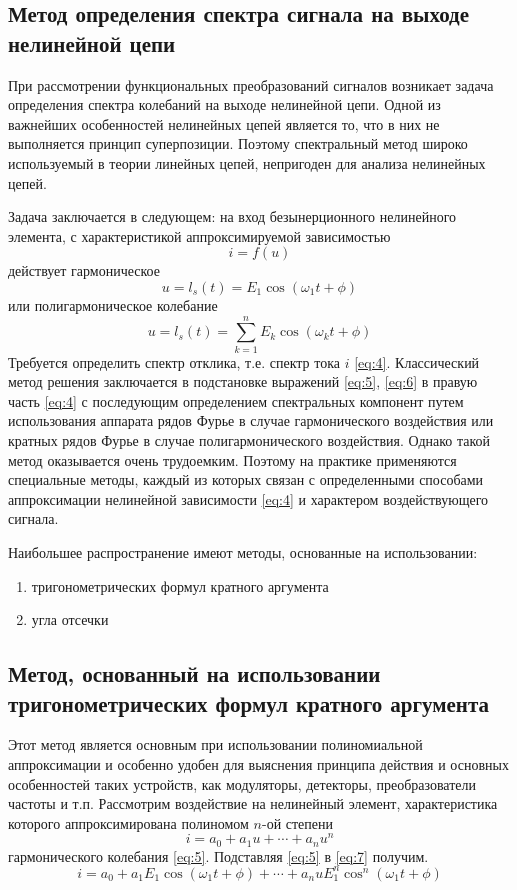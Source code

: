 \subsection{Метод определения спектра сигнала на выходе нелинейной цепи}
При рассмотрении функциональных преобразований сигналов возникает задача определения спектра колебаний на выходе нелинейной цепи. Одной из важнейших особенностей нелинейных цепей является то, что в них не выполняется принцип суперпозиции. Поэтому спектральный метод широко используемый в теории линейных цепей, непригоден для анализа нелинейных цепей.

Задача заключается в следующем: на вход безынерционного нелинейного элемента, с характеристикой аппроксимируемой зависимостью
\begin{equation}
i=f(u)
\label{eq:4}
\end{equation}
действует гармоническое
\begin{equation}
u=l_s(t)=E_1\cos(\omega_1t+\phi)
\label{eq:5}
\end{equation}
или полигармоническое колебание
\begin{equation}
u=l_s(t)=\sum_{k=1}^{n}E_k\cos(\omega_kt+\phi)
\label{eq:6}
\end{equation}
Требуется определить спектр отклика, т.е. спектр тока $i$ \eqref{eq:4}.
Классический метод решения заключается в подстановке выражений \eqref{eq:5}, \eqref{eq:6} в правую часть \eqref{eq:4} с последующим определением спектральных компонент путем использования аппарата рядов Фурье в случае гармонического воздействия или кратных рядов Фурье в случае полигармонического воздействия. Однако такой метод оказывается очень трудоемким. Поэтому на практике применяются специальные методы, каждый из которых связан с определенными способами аппроксимации нелинейной зависимости \eqref{eq:4} и характером воздействующего сигнала.

Наибольшее распространение имеют методы, основанные на использовании: 
\begin{enumerate}
	\item тригонометрических формул кратного аргумента
	\item угла отсечки
\end{enumerate}

\subsection{Метод, основанный на использовании тригонометрических формул кратного аргумента}
Этот метод является основным при использовании полиномиальной аппроксимации и особенно удобен для выяснения принципа действия и основных особенностей таких устройств, как модуляторы, детекторы, преобразователи частоты и т.п. Рассмотрим воздействие на нелинейный элемент, характеристика которого аппроксимирована полиномом $n$-ой степени
\begin{equation}
i=a_0+a_1u+\cdots+a_nu^n
\label{eq:7}
\end{equation}
гармонического колебания \eqref{eq:5}. Подставляя \eqref{eq:5} в \eqref{eq:7} получим. 
\begin{equation}
i=a_0+a_1E_1\cos(\omega_1t+\phi)+\cdots+a_nuE_1^n\cos^n(\omega_1t+\phi)
\label{eq:8}
\end{equation}


